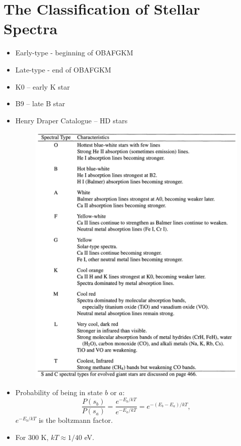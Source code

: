 \documentclass[12pt]{article}
\begin{document}
\section{The Classification of Stellar Spectra}
\begin{itemize}
\item Early-type - beginning of OBAFGKM
\item Late-type - end of OBAFGKM
\item K0 -- early K star
\item B9 -- late B star
\item Henry Draper Catalogue -- HD stars
\begin{figure}[h!]
\centering
\includegraphics[width = 5in]{CandOfigs/spectraltypes.png}
\end{figure}
\item Probability of being in state $b$ or $a$:
\begin{equation}
\frac{P(s_b)}{P(s_a)} = \frac{e^{-E_b/kT}}{e^{-E_a/kT}} = e^{-(E_b - E_a)/kT},
\end{equation}
$e^{-E_b/kT}$ is the boltzmann factor.
\item For 300 K, $kT \approx 1/40$ eV.

\end{itemize}
\end{document}
